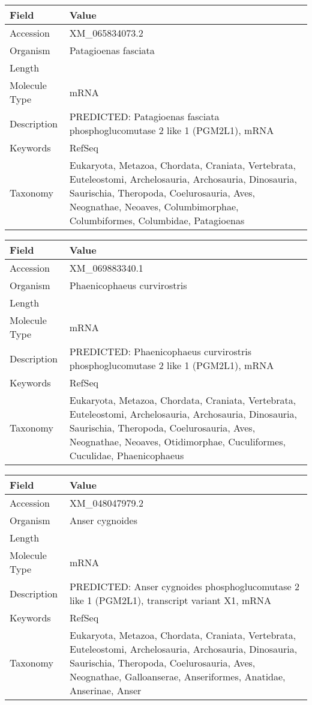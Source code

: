 \documentclass[10pt]{article}
\begin{document}
\vspace{1em}
{\footnotesize
\begin{longtable}{>{\raggedright\arraybackslash}p{4.5cm} >{\raggedright\arraybackslash}p{11.5cm}}
\textbf{Field} & \textbf{Value} \\
\hline
Accession & XM\_065834073.2 \\
Organism & Patagioenas fasciata \\
Length & 5735 \\
Molecule Type & mRNA \\
Description & PREDICTED: Patagioenas fasciata phosphoglucomutase 2 like 1 (PGM2L1), mRNA \\
Keywords & RefSeq \\
Taxonomy & Eukaryota, Metazoa, Chordata, Craniata, Vertebrata, Euteleostomi, Archelosauria, Archosauria, Dinosauria, Saurischia, Theropoda, Coelurosauria, Aves, Neognathae, Neoaves, Columbimorphae, Columbiformes, Columbidae, Patagioenas \\
\end{longtable}
}

\vspace{1em}
{\footnotesize
\begin{longtable}{>{\raggedright\arraybackslash}p{4.5cm} >{\raggedright\arraybackslash}p{11.5cm}}
\textbf{Field} & \textbf{Value} \\
\hline
Accession & XM\_069883340.1 \\
Organism & Phaenicophaeus curvirostris \\
Length & 4706 \\
Molecule Type & mRNA \\
Description & PREDICTED: Phaenicophaeus curvirostris phosphoglucomutase 2 like 1 (PGM2L1), mRNA \\
Keywords & RefSeq \\
Taxonomy & Eukaryota, Metazoa, Chordata, Craniata, Vertebrata, Euteleostomi, Archelosauria, Archosauria, Dinosauria, Saurischia, Theropoda, Coelurosauria, Aves, Neognathae, Neoaves, Otidimorphae, Cuculiformes, Cuculidae, Phaenicophaeus \\
\end{longtable}
}

\vspace{1em}
{\footnotesize
\begin{longtable}{>{\raggedright\arraybackslash}p{4.5cm} >{\raggedright\arraybackslash}p{11.5cm}}
\textbf{Field} & \textbf{Value} \\
\hline
Accession & XM\_048047979.2 \\
Organism & Anser cygnoides \\
Length & 6462 \\
Molecule Type & mRNA \\
Description & PREDICTED: Anser cygnoides phosphoglucomutase 2 like 1 (PGM2L1), transcript variant X1, mRNA \\
Keywords & RefSeq \\
Taxonomy & Eukaryota, Metazoa, Chordata, Craniata, Vertebrata, Euteleostomi, Archelosauria, Archosauria, Dinosauria, Saurischia, Theropoda, Coelurosauria, Aves, Neognathae, Galloanserae, Anseriformes, Anatidae, Anserinae, Anser \\
\end{longtable}
}
\end{document}
